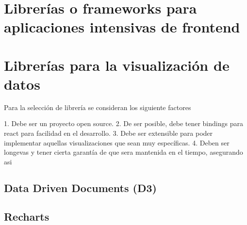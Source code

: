 \section{Librerías o frameworks para aplicaciones intensivas de frontend}



\section{Librerías para la visualización de datos}

Para la selección de librería se consideran los siguiente factores

1. Debe ser un proyecto open source.
2. De ser posible, debe tener bindings para react para facilidad en el desarrollo.
3. Debe ser extensible para poder implementar aquellas visualizaciones que sean muy específicas.
4. Deben ser longevas y tener cierta garantía de que sera mantenida en el tiempo, asegurando asi 

\subsection{ Data Driven Documents (D3) }




\subsection{ Recharts }





\subsection{  }




